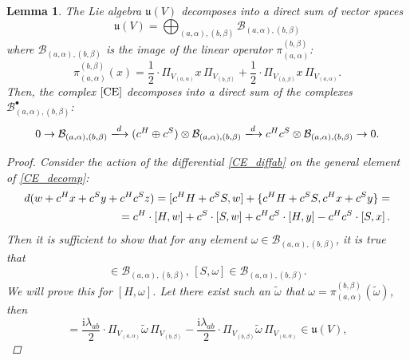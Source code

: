 \documentclass[10pt,a4paper]{amsart}
\newtheorem{lemma}{Lemma}
\begin{document}
\begin{lemma} \label{lemma:decomposition}
    The Lie algebra $\mathfrak{u}(V)$ decomposes into a direct sum of vector spaces
    \begin{equation}
    \label{grading}
        \mathfrak{u}(V)=\bigoplus_{(a,\alpha),(b,\beta)}\mathcal{B}_{(a,\alpha),(b,\beta)}
    \end{equation}
    where $\mathcal{B}_{(a,\alpha),(b,\beta)}$ is the image of the linear operator $\pi_{(a,\alpha)}^{(b,\beta)}$:
    \begin{equation}
        \pi_{(a,\alpha)}^{(b,\beta)}(x)=\frac{1}{2}\cdot \Pi_{V_{(a,\alpha)}}x\,\Pi_{V_{(b,\beta)}}+\frac{1}{2}\cdot \Pi_{V_{(b,\beta)}}x\,\Pi_{V_{(a,\alpha)}}.
    \end{equation}
    Then, the complex $\eqref{CE}$ decomposes into a direct sum of the complexes $\mathcal{B}_{(a,\alpha),(b,\beta)}^{\bullet}$:
    \begin{equation}
    \label{CE_decomp}
        0\rightarrow \mathcal{B}_{(a,\alpha),(b,\beta)}\xlongrightarrow{d}(c^H\oplus c^S)\otimes \mathcal{B}_{(a,\alpha),(b,\beta)} \xlongrightarrow{d} c^H c^S\otimes \mathcal{B}_{(a,\alpha),(b,\beta)}\rightarrow 0.
    \end{equation}
    \begin{proof}
    Consider the action of the differential \eqref{CE_diffab} on the general element of \eqref{CE_decomp}:
        \begin{eqnarray}
            \notag d(w+c^{H}x+c^{S}y+c^{H}c^{S}z)=[c^H H+c^S S, w]+\{c^H H+c^S S,c^{H}x+c^{S}y\}=\\=c^{H}\cdot [H,w]+c^{S}\cdot [S,w]+c^{H}c^{S}\cdot[H,y]-c^{H}c^{S}\cdot[S,x]\,.
        \end{eqnarray}
    Then it is sufficient to show that for any element $\omega\in\mathcal{B}_{(a,\alpha),(b,\beta)}$, it is true that 
        \begin{equation}
            [H,\omega]\in\mathcal{B}_{(a,\alpha),(b,\beta)},\, [S,\omega]\in\mathcal{B}_{(a,\alpha),(b,\beta)}.
        \end{equation}
    We will prove this for $[H,\omega]$. Let there exist such an $\tilde{\omega}$ that $\omega=\pi_{(a,\alpha)}^{(b,\beta)}(\tilde{\omega})$, then
        \begin{equation}
            [H,\omega]=\frac{\mathrm{i}\lambda_{ab}}{2}\cdot \Pi_{V_{(a,\alpha)}}\tilde{\omega}\,\Pi_{V_{(b,\beta)}}-\frac{\mathrm{i}\lambda_{ab}}{2}\cdot \Pi_{V_{(b,\beta)}}\tilde{\omega}\,\Pi_{V_{(a,\alpha)}}\in \mathfrak{u}(V),
        \end{equation}

\end{proof}
\end{lemma}
\end{document}
